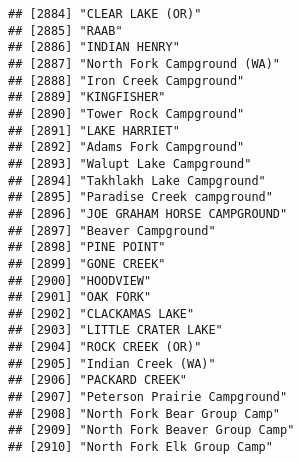 \documentclass[
]{article}
\begin{document}
\begin{verbatim}
## [2884] "CLEAR LAKE (OR)"                                                                     
## [2885] "RAAB"                                                                                
## [2886] "INDIAN HENRY"                                                                        
## [2887] "North Fork Campground (WA)"                                                          
## [2888] "Iron Creek Campground"                                                               
## [2889] "KINGFISHER"                                                                          
## [2890] "Tower Rock Campground"                                                               
## [2891] "LAKE HARRIET"                                                                        
## [2892] "Adams Fork Campground"                                                               
## [2893] "Walupt Lake Campground"                                                              
## [2894] "Takhlakh Lake Campground"                                                            
## [2895] "Paradise Creek campground"                                                           
## [2896] "JOE GRAHAM HORSE CAMPGROUND"                                                         
## [2897] "Beaver Campground"                                                                   
## [2898] "PINE POINT"                                                                          
## [2899] "GONE CREEK"                                                                          
## [2900] "HOODVIEW"                                                                            
## [2901] "OAK FORK"                                                                            
## [2902] "CLACKAMAS LAKE"                                                                      
## [2903] "LITTLE CRATER LAKE"                                                                  
## [2904] "ROCK CREEK (OR)"                                                                     
## [2905] "Indian Creek (WA)"                                                                   
## [2906] "PACKARD CREEK"                                                                       
## [2907] "Peterson Prairie Campground"                                                         
## [2908] "North Fork Bear Group Camp"                                                          
## [2909] "North Fork Beaver Group Camp"                                                        
## [2910] "North Fork Elk Group Camp"                                                           

\end{verbatim}
\end{document}

